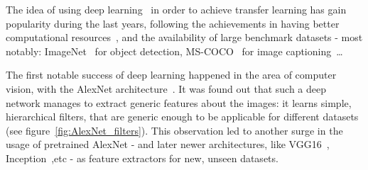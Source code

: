   \par The idea of using deep learning~\citep{lecun2015deep} in order to achieve transfer learning has gain popularity during the last years, following the achievements in having better computational resources~\citep{raina2009large}, and the availability of large benchmark datasets - most notably: ImageNet~\citep{imagenet_cvpr09} for object detection, MS-COCO~\citep{2014arXiv1405.0312L} for image captioning~\ldots

  \par The first notable success of deep learning happened in the area of computer vision, with the AlexNet architecture~\citep{krizhevsky2012imagenet}. It was found out that such a deep network manages to extract generic features about the images: it learns simple, hierarchical filters, that are generic enough to be applicable for different datasets (see figure~\ref{fig:AlexNet_filters}). This observation led to another surge in the usage of pretrained AlexNet - and later newer architectures, like VGG16~\citep{simonyan2014very}, Inception~\citep{szegedy2015going},etc - as feature extractors for new, unseen datasets.

